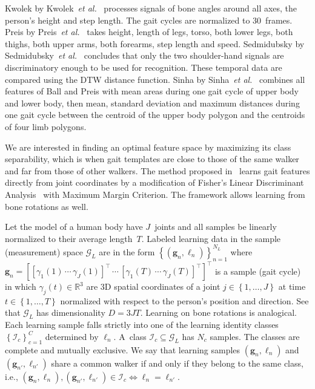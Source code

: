 \documentclass[10pt,a4paper]{llncs}
\newcommand{\gC}{\ensuremath{C}} %
\newcommand{\gD}{\ensuremath{D}} %
\newcommand{\gG}{\ensuremath{\mathcal{G}}} %
\newcommand{\gGn}[1]{\ensuremath{\gB{g}_{#1}}} %
\newcommand{\gGAMMAjt}[2]{\ensuremath{\gamma_{#1}\left(#2\right)}} %
\newcommand{\gIc}[1]{\ensuremath{\mathcal{I}_{#1}}} %
\newcommand{\gJ}{\ensuremath{J}} %
\newcommand{\gLAMBDAn}[1]{\ensuremath{\ell_{#1}}} %
\newcommand{\gN}{\ensuremath{N}} %
\newcommand{\gNc}[1]{\ensuremath{\gN_{#1}}} %
\newcommand{\gT}{\ensuremath{T}} %
\newcommand{\gB}[1]{\ensuremath{\mathbf{#1}}} %
\newcommand{\gL}[1]{\ensuremath{{#1}_L}} %
\newcommand\etal{\textit{et al.}\xspace}
\begin{document}
\begin{itemize}
\method Kwolek by Kwolek~\etal~\cite{KKMJ14} processes signals of bone angles around all axes, the person's height and step length. The gait cycles are normalized to 30~frames.
\method Preis by Preis~\etal~\cite{PKWL12} takes height, length of legs, torso, both lower legs, both thighs, both upper arms, both forearms, step length and speed.
\method Sedmidubsky by Sedmidubsky~\etal~\cite{SVBZ12} concludes that only the two shoulder-hand signals are discriminatory enough to be used for recognition. These temporal data are compared using the DTW distance function.
\method Sinha by Sinha~\etal~\cite{SCB13} combines all features of Ball and Preis with mean areas during one gait cycle of upper body and lower body, then mean, standard deviation and maximum distances during one gait cycle between the centroid of the upper body polygon and the centroids of four limb polygons.
\end{itemize}

We are interested in finding an optimal feature space by maximizing its class separability, which is when gait templates are close to those of the same walker and far from those of other walkers. The method proposed in~\cite{BS16a,BS16b} learns gait features directly from joint coordinates by a modification of Fisher’s Linear Discriminant Analysis~\cite{F36} with Maximum Margin Criterion. The framework allows learning from bone rotations as well.

Let the model of a human body have $\gJ$~joints and all samples be linearly normalized to their average length~$\gT$. Labeled learning data in the sample (measurement) space $\gL{\gG}$ are in the form $\left\{\left(\gGn{n},\gLAMBDAn{n}\right)\right\}_{n=1}^{\gL{\gN}}$ where $\gGn{n}=\left[[\gGAMMAjt{1}{1}\,\cdots\,\gGAMMAjt{\gJ}{1}]^\top\,\cdots\,[\gGAMMAjt{1}{\gT}\,\cdots\,\gGAMMAjt{\gJ}{\gT}]^\top\right]^\top$ is a sample (gait cycle) in which $\gGAMMAjt{j}{t}\in\mathbb{R}^3$ are 3D spatial coordinates of a joint $j\in\left\{1,\ldots,\gJ\right\}$ at time $t\in\left\{1,\ldots,\gT\right\}$ normalized with respect to the person's position and direction. See that $\gL{\gG}$ has dimensionality $\gD=3\gJ\gT$. Learning on bone rotations is analogical. Each learning sample falls strictly into one of the learning identity classes $\left\{\gIc{c}\right\}_{c=1}^{\gC}$ determined by $\gLAMBDAn{n}$. A~class $\gIc{c}\subseteq\gL{\gG}$ has $\gNc{c}$ samples. The classes are complete and mutually exclusive. We say that learning samples $\left(\gGn{n},\gLAMBDAn{n}\right)$ and $\left(\gGn{n'},\gLAMBDAn{n'}\right)$ share a common walker if and only if they belong to the same class, i.e., $\left(\gGn{n},\gLAMBDAn{n}\right),\left(\gGn{n'},\gLAMBDAn{n'}\right)\in\gIc{c}\Leftrightarrow\gLAMBDAn{n}=\gLAMBDAn{n'}$.
\end{document}
